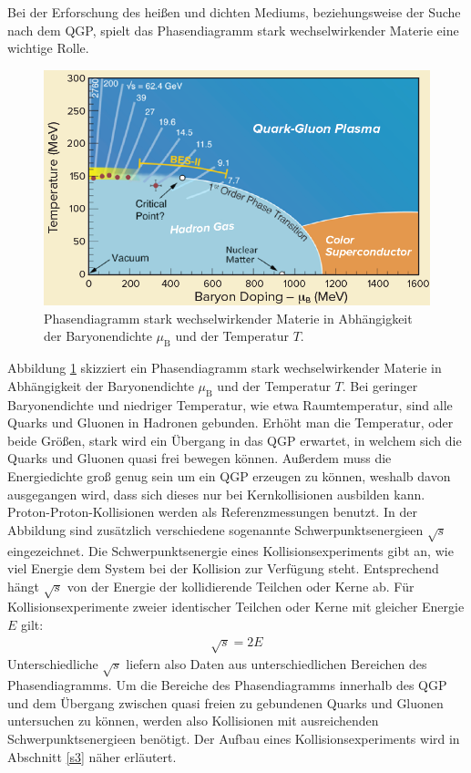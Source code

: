 \newline
Bei der Erforschung des hei{\ss}en und dichten Mediums, beziehungsweise der Suche nach dem QGP, spielt das Phasendiagramm stark wechselwirkender Materie eine wichtige Rolle.
\begin{figure}[thp]
\centering
\includegraphics[width=.7\linewidth]{QGPPhaseDiagram.png}
\caption{Phasendiagramm stark wechselwirkender Materie in Abh\"angigkeit der Baryonendichte $\mu_{\text{B}}$ und der Temperatur $T$.
\cite{PAPER:1}}
\label{fig:QGPPhase}
\end{figure}
Abbildung \ref{fig:QGPPhase} skizziert ein Phasendiagramm stark wechselwirkender Materie in Abh\"angigkeit der Baryonendichte $\mu_{\text{B}}$ und der Temperatur $T$.
Bei geringer Baryonendichte und niedriger Temperatur, wie etwa Raumtemperatur, sind alle Quarks und Gluonen in Hadronen gebunden.
Erh\"oht man die Temperatur, oder beide Gr\"o{\ss}en, stark wird ein \"Ubergang in das QGP erwartet, in welchem sich die Quarks und Gluonen quasi frei bewegen k\"onnen.
Au{\ss}erdem muss die Energiedichte gro{\ss} genug sein um ein QGP erzeugen zu k\"onnen, weshalb davon ausgegangen wird, dass sich dieses nur bei Kernkollisionen ausbilden kann.
Proton-Proton-Kollisionen werden als Referenzmessungen benutzt.
\newline
In der Abbildung sind zus\"atzlich verschiedene sogenannte Schwerpunktsenergieen $\sqrt{s}$ eingezeichnet.
Die Schwerpunktsenergie eines Kollisionsexperiments gibt an, wie viel Energie dem System bei der Kollision zur Verf\"ugung steht.
Entsprechend h\"angt $\sqrt{s}$ von der Energie der kollidierende Teilchen oder Kerne ab.
F\"ur Kollisionsexperimente zweier identischer Teilchen oder Kerne mit gleicher Energie $E$ gilt:
\begin{align}
\sqrt{s} = 2E \label{eq:sqrts}
\end{align}
Unterschiedliche $\sqrt{s}$ liefern also Daten aus unterschiedlichen Bereichen des Phasendiagramms.
Um die Bereiche des Phasendiagramms innerhalb des QGP und dem \"Ubergang zwischen quasi freien zu gebundenen Quarks und Gluonen untersuchen zu k\"onnen, werden also Kollisionen mit ausreichenden Schwerpunktsenergieen ben\"otigt.
Der Aufbau eines Kollisionsexperiments wird in Abschnitt \ref{s3} n\"aher erl\"autert.


